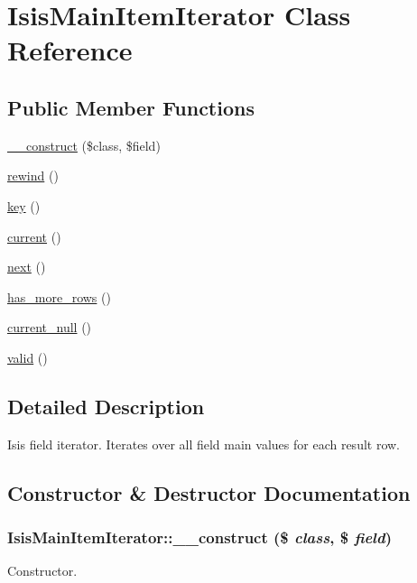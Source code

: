 \hypertarget{classIsisMainItemIterator}{
\section{IsisMainItemIterator Class Reference}
\label{classIsisMainItemIterator}
}
\subsection*{Public Member Functions}
\begin{DoxyCompactItemize}
\item 
\hyperlink{classIsisMainItemIterator_a486e2d00fe13ed908b7384d64fd5f6f0}{\_\-\_\-construct} (\$class, \$field)
\item 
\hyperlink{classIsisMainItemIterator_a37bf1484646334c5c41d3f7f50558b07}{rewind} ()
\item 
\hyperlink{classIsisMainItemIterator_a3676fc993eb38641c65363f2e05873f3}{key} ()
\item 
\hyperlink{classIsisMainItemIterator_adab612db1a4e1f16c6bc5848c3d4ee21}{current} ()
\item 
\hyperlink{classIsisMainItemIterator_af63043a1ab350854c0a30561ccb42dae}{next} ()
\item 
\hyperlink{classIsisMainItemIterator_a6c406f34a89316ff7e7fa15a80806b39}{has\_\-more\_\-rows} ()
\item 
\hyperlink{classIsisMainItemIterator_ad0f3d297912d5101d5227139f8414c80}{current\_\-null} ()
\item 
\hyperlink{classIsisMainItemIterator_a376387f6168a95890fc9f3a441967135}{valid} ()
\end{DoxyCompactItemize}


\subsection{Detailed Description}
Isis field iterator. Iterates over all field main values for each result row. 

\subsection{Constructor \& Destructor Documentation}
\hypertarget{classIsisMainItemIterator_a486e2d00fe13ed908b7384d64fd5f6f0}{
\subsubsection[{\_\-\_\-construct}]{\setlength{\rightskip}{0pt plus 5cm}IsisMainItemIterator::\_\-\_\-construct (\$ {\em class}, \/  \$ {\em field})}}
\label{classIsisMainItemIterator_a486e2d00fe13ed908b7384d64fd5f6f0}
Constructor.


